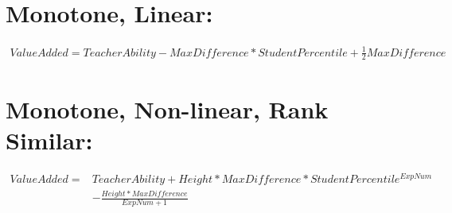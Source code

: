 \documentclass{article}
\begin{document}

\section*{Monotone, Linear:}


\begin{align*}
    ValueAdded = TeacherAbility - MaxDifference*StudentPercentile + \frac{1}{2}MaxDifference
\end{align*}






\section*{Monotone, Non-linear, Rank Similar:}


\begin{align*}
    ValueAdded = & TeacherAbility + Height*MaxDifference*StudentPercentile^{ExpNum} \\ 
    & - \frac{Height*MaxDifference}{ExpNum + 1}
\end{align*}
\end{document}
